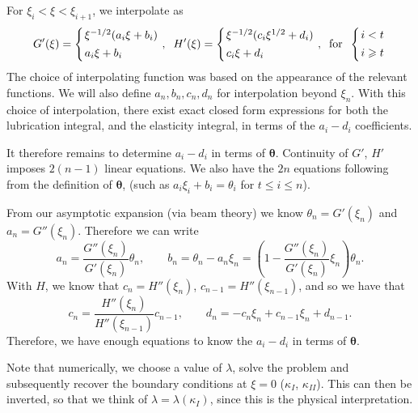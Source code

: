 \documentclass{jfm}
\begin{document}
For $\xi_i < \xi < \xi_{i+1}$, we interpolate as
\begin{equation}
\setlength{\arraycolsep}{1pt}
G'(\xi) = \left\{ \begin{array}{l}  
\xi^{-1/2}(a_i \xi + b_i) \\[4pt]
a_i \xi + b_i
 \end{array}\right., \;\;
H'(\xi) = \left\{ \begin{array}{l}  
\xi^{-1/2}(c_i \xi^{1/2} + d_i) \\[4pt]
c_i \xi + d_i
 \end{array}\right. , \;\;
\mbox{for} \;\; \left\{ \begin{array}{l}  
i<t\\[4pt]
i\geq t
\end{array}\right.
\end{equation}
The choice of interpolating function 
was based on the appearance of the relevant functions.
We will also define $a_n,b_n,c_n,d_n$ for interpolation beyond $\xi_n$.
With this choice of interpolation,
there exist exact closed form expressions for both the lubrication integral,
and the elasticity integral, in terms of the $a_i - d_i$ coefficients.

It therefore remains to determine $a_i -d_i$ in terms of $\boldsymbol{\theta}$.
Continuity of $G'$, $H'$ imposes $2(n-1)$ linear equations. 
We also have the $2n$ equations following from the definition
of $\boldsymbol{\theta}$, (such as $a_i \xi_i + b_i = \theta_i$ for 
$t\leq i \leq n$). 

From our asymptotic expansion 
(via beam theory) we know $\theta_n = G'(\xi_n)$ and $a_n = G''(\xi_n)$. 
Therefore we can write
\begin{equation}
a_n = \frac{G''(\xi_n)}{G'(\xi_n)} \theta_n, \qquad
b_n  = \theta_n - a_n \xi_n = \left( 1 - \frac{G''(\xi_n)}
{G'(\xi_n)}\xi_n \right) \theta_n.
\end{equation}
With $H$, we know that $c_n = H''(\xi_n)$, $c_{n-1} = H''(\xi_{n-1})$, and
so we have that 
\begin{equation}
c_n = \frac{H''(\xi_n)}{H''(\xi_{n-1})} c_{n-1}, \qquad
d_n = -c_n \xi_n + c_{n-1}\xi_n + d_{n-1}.
\end{equation}
Therefore, we have enough equations to know the $a_i-d_i$ in terms of 
$\boldsymbol{\theta}$.

Note that numerically, we choose a value of $\lambda$, 
solve the problem and subsequently recover
the boundary conditions at $\xi=0$ ($\kappa_I$, $\kappa_{II}$).
This can then be inverted, so that we think of $\lambda = \lambda(\kappa_I)$,
since this is the physical interpretation.
\end{document}
